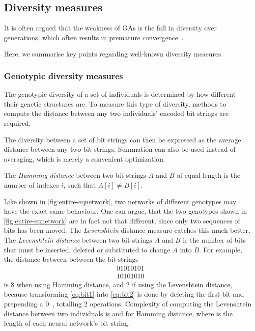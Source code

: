 \subsection{Diversity measures}
\label{sec:diversitymeasures}
It is often argued that the weakness of GAs is the fall in diversity over generations, which often results in premature convergence~\cite{diaz2007empirical, 1266373,Zitzler00comparisonof}.

Here, we summarise key points regarding well-known diversity measures. %

\subsubsection{Genotypic diversity measures}
The genotypic diversity of a set of individuals is determined by how different their genetic structures are. To measure this type of diversity, methods to compute the distance between any two individuals' encoded bit strings are required.

The diversity between a set of bit strings can then be expressed as the average distance between any two bit strings. Summation can also be used instead of averaging, which is merely a convenient optimization.

The \emph{Hamming distance} between two bit strings $A$ and $B$ of equal length is the number of indexes $i$, such that $A[i] \neq B[i]$.

Like shown in \cref{fig:entire-eqnetwork}, two networks of different genotypes may have the exact same behaviour.
One can argue, that the two genotypes shown in \cref{fig:entire-eqnetwork} are in fact not that different, since only two sequences of bits has been moved. 
The \emph{Levenshtein} distance measure catches this much better. The \emph{Levenshtein distance} between two bit strings $A$ and $B$ is the number of bits that must be inserted, deleted or substituted to change $A$ into $B$. For example, the distance between between the bit strings
%
\begin{align}
&01010101\label{eq:bit1} \\
&10101010\label{eq:bit2}
\end{align}
%
is 8 when using Hamming distance, and 2 if using the Levenshtein distance, because transforming \cref{eq:bit1} into \cref{eq:bit2} is done by deleting the first bit and prepending a $0$~\cite{1250187}, totalling 2 operations. Complexity of computing the Levenshtein distance between two individuals is  and \bigO{\bitstringl} for Hamming distance, where \bitstringl{} is the length of each neural network's bit string.

